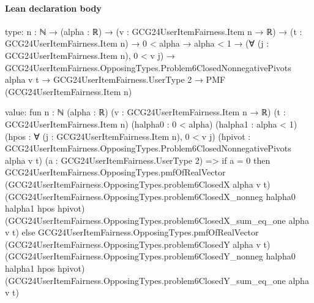 \documentclass[10pt]{article}
\begin{document}
\paragraph{Lean declaration body}
\begin{ReviewVerbatim}
type:
{n : ℕ} →
  (alpha : ℝ) →
    (v : GCG24UserItemFairness.Item n → ℝ) →
      (t : GCG24UserItemFairness.Item n) →
        0 < alpha →
          alpha < 1 →
            (∀ (j : GCG24UserItemFairness.Item n), 0 < v j) →
              GCG24UserItemFairness.OpposingTypes.Problem6ClosedNonnegativePivots alpha v t →
                GCG24UserItemFairness.UserType 2 → PMF (GCG24UserItemFairness.Item n)

value:
fun {n : ℕ} (alpha : ℝ) (v : GCG24UserItemFairness.Item n → ℝ) (t : GCG24UserItemFairness.Item n) (halpha0 : 0 < alpha)
    (halpha1 : alpha < 1) (hpos : ∀ (j : GCG24UserItemFairness.Item n), 0 < v j)
    (hpivot : GCG24UserItemFairness.OpposingTypes.Problem6ClosedNonnegativePivots alpha v t)
    (a : GCG24UserItemFairness.UserType 2) =>
  if a = 0 then
    GCG24UserItemFairness.OpposingTypes.pmfOfRealVector (GCG24UserItemFairness.OpposingTypes.problem6ClosedX alpha v t)
      (GCG24UserItemFairness.OpposingTypes.problem6ClosedX_nonneg halpha0 halpha1 hpos hpivot)
      (GCG24UserItemFairness.OpposingTypes.problem6ClosedX_sum_eq_one alpha v t)
  else
    GCG24UserItemFairness.OpposingTypes.pmfOfRealVector (GCG24UserItemFairness.OpposingTypes.problem6ClosedY alpha v t)
      (GCG24UserItemFairness.OpposingTypes.problem6ClosedY_nonneg halpha0 halpha1 hpos hpivot)
      (GCG24UserItemFairness.OpposingTypes.problem6ClosedY_sum_eq_one alpha v t)
\end{ReviewVerbatim}
\end{document}
